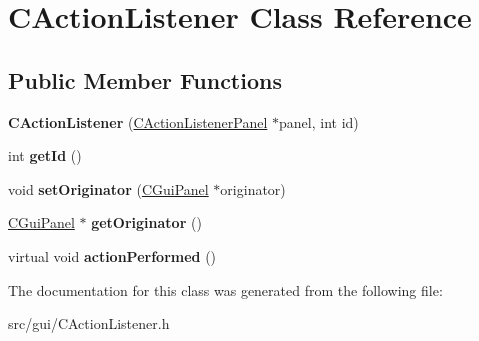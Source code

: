 \hypertarget{class_c_action_listener}{
\section{CActionListener Class Reference}
\label{class_c_action_listener}
}
\subsection*{Public Member Functions}
\begin{DoxyCompactItemize}
\item 
\hypertarget{class_c_action_listener_ab8acd0c528a02e67c99b18ed86766160}{
{\bfseries CActionListener} (\hyperlink{class_c_action_listener_panel}{CActionListenerPanel} $\ast$panel, int id)}
\label{class_c_action_listener_ab8acd0c528a02e67c99b18ed86766160}

\item 
\hypertarget{class_c_action_listener_a933066180a2fde943e51958589248d5c}{
int {\bfseries getId} ()}
\label{class_c_action_listener_a933066180a2fde943e51958589248d5c}

\item 
\hypertarget{class_c_action_listener_a3418ba195f34df54d13e6a3d9bdd8fb4}{
void {\bfseries setOriginator} (\hyperlink{class_c_gui_panel}{CGuiPanel} $\ast$originator)}
\label{class_c_action_listener_a3418ba195f34df54d13e6a3d9bdd8fb4}

\item 
\hypertarget{class_c_action_listener_ae515ec689cd0f428c2c306210d075c8e}{
\hyperlink{class_c_gui_panel}{CGuiPanel} $\ast$ {\bfseries getOriginator} ()}
\label{class_c_action_listener_ae515ec689cd0f428c2c306210d075c8e}

\item 
\hypertarget{class_c_action_listener_a00298af5a1be8beaeb4bb88835832922}{
virtual void {\bfseries actionPerformed} ()}
\label{class_c_action_listener_a00298af5a1be8beaeb4bb88835832922}

\end{DoxyCompactItemize}


The documentation for this class was generated from the following file:\begin{DoxyCompactItemize}
\item 
src/gui/CActionListener.h\end{DoxyCompactItemize}
